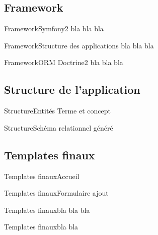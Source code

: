 \subsection{Framework}
\begin{frame}{Framework}{Symfony2}
bla bla bla
\end{frame}

\begin{frame}{Framework}{Structure des applications}
bla bla bla
\end{frame}

\begin{frame}{Framework}{ORM Doctrine2}
bla bla bla
\end{frame}

\subsection{Structure de l'application}
\begin{frame}{Structure}{Entités}
Terme et concept
\end{frame}

\begin{frame}{Structure}{Schéma relationnel généré}
\end{frame}

\subsection{Templates finaux}
\begin{frame}{Templates finaux}{Accueil}
\end{frame}
\begin{frame}{Templates finaux}{Formulaire ajout}
\end{frame}
\begin{frame}{Templates finaux}{bla bla bla}
\end{frame}
\begin{frame}{Templates finaux}{bla bla}
\end{frame}